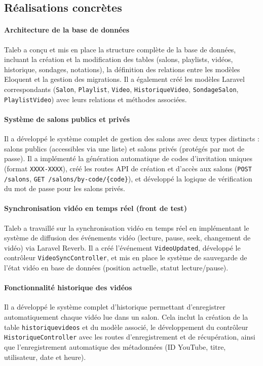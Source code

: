\documentclass[12pt,a4paper]{report}
\begin{document}
\subsection*{Réalisations concrètes}

\paragraph{Architecture de la base de données}
Taleb a conçu et mis en place la structure complète de la base de données, incluant la création et la modification des tables (salons, playlists, vidéos, historique, sondages, notations), la définition des relations entre les modèles Eloquent et la gestion des migrations. Il a également créé les modèles Laravel correspondants (\texttt{Salon}, \texttt{Playlist}, \texttt{Video}, \texttt{HistoriqueVideo}, \texttt{SondageSalon}, \texttt{PlaylistVideo}) avec leurs relations et méthodes associées.

\paragraph{Système de salons publics et privés}
Il a développé le système complet de gestion des salons avec deux types distincts : salons publics (accessibles via une liste) et salons privés (protégés par mot de passe). Il a implémenté la génération automatique de codes d'invitation uniques (format \texttt{XXXX-XXXX}), créé les routes API de création et d'accès aux salons (\texttt{POST /salons}, \texttt{GET /salons/by-code/\{code\}}), et développé la logique de vérification du mot de passe pour les salons privés.

\paragraph{Synchronisation vidéo en temps réel (front de test)}
Taleb a travaillé sur la synchronisation vidéo en temps réel en implémentant le système de diffusion des événements vidéo (lecture, pause, seek, changement de vidéo) via Laravel Reverb. Il a créé l'événement \texttt{VideoUpdated}, développé le contrôleur \texttt{VideoSyncController}, et mis en place le système de sauvegarde de l'état vidéo en base de données (position actuelle, statut lecture/pause).

\paragraph{Fonctionnalité historique des vidéos}
Il a développé le système complet d'historique permettant d'enregistrer automatiquement chaque vidéo lue dans un salon. Cela inclut la création de la table \texttt{historiquevideos} et du modèle associé, le développement du contrôleur \texttt{HistoriqueController} avec les routes d'enregistrement et de récupération, ainsi que l'enregistrement automatique des métadonnées (ID YouTube, titre, utilisateur, date et heure).
\end{document}
